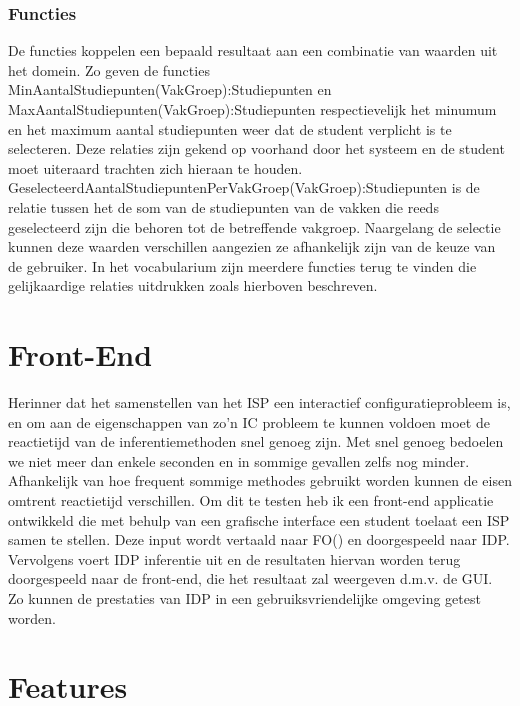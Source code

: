 \subsubsection{Functies}
De functies koppelen een bepaald resultaat aan een combinatie van waarden uit het domein. Zo geven de functies MinAantalStudiepunten(VakGroep):Studiepunten en MaxAantalStudiepunten(VakGroep):Studiepunten respectievelijk het minumum en het maximum aantal studiepunten weer dat de student verplicht is te selecteren. Deze relaties zijn gekend op voorhand door het systeem en de student moet uiteraard trachten zich hieraan te houden. GeselecteerdAantalStudiepuntenPerVakGroep(VakGroep):Studiepunten is de relatie tussen het de som van de studiepunten van de vakken die reeds geselecteerd zijn die behoren tot de betreffende vakgroep. Naargelang de selectie kunnen deze waarden verschillen aangezien ze afhankelijk zijn van de keuze van de gebruiker. In het vocabularium zijn meerdere functies terug te vinden die gelijkaardige relaties uitdrukken zoals hierboven beschreven. 

\section{Front-End}
Herinner dat het samenstellen van het ISP een interactief configuratieprobleem is, en om aan de eigenschappen van zo'n IC probleem te kunnen voldoen moet de reactietijd van de inferentiemethoden snel genoeg zijn. Met snel genoeg bedoelen we niet meer dan enkele seconden en in sommige gevallen zelfs nog minder. Afhankelijk van hoe frequent sommige methodes gebruikt worden kunnen de eisen omtrent reactietijd verschillen. Om dit te testen heb ik een front-end applicatie ontwikkeld die met behulp van een grafische interface een student toelaat een ISP samen te stellen. Deze input wordt vertaald naar FO(\textperiodcentered) en doorgespeeld naar IDP. Vervolgens voert IDP inferentie uit en de resultaten hiervan worden terug doorgespeeld naar de front-end, die het resultaat zal weergeven d.m.v. de GUI. Zo kunnen de prestaties van IDP in een gebruiksvriendelijke omgeving getest worden. 


\section{Features}

